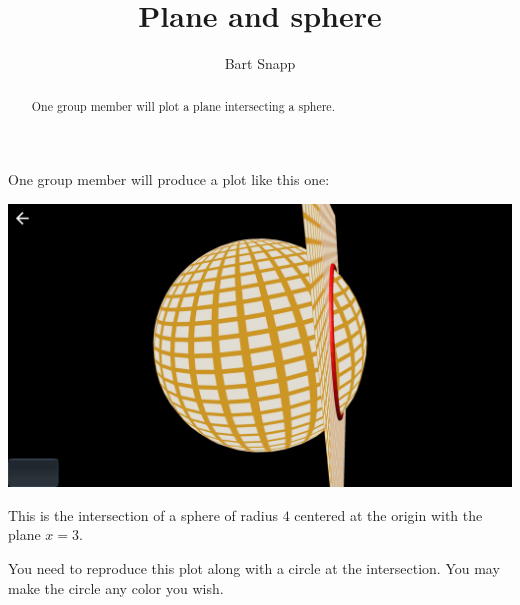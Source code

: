 \documentclass{ximera}
\author{Bart Snapp}
\title{Plane and sphere}
\begin{document}
\begin{abstract}
  One group member will plot a plane intersecting a sphere.
\end{abstract}
\maketitle

One group member will produce a plot like this one:
\begin{image}
  \includegraphics{planeAndSphere.png}
\end{image}

This is the intersection of a sphere of radius $4$ centered at the origin with the plane $x=3$.

You need to reproduce this plot along with a circle at the
intersection. You may make the circle any color you wish.
\end{document}
